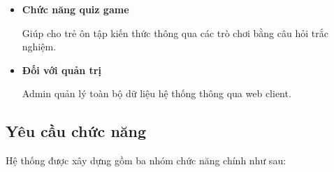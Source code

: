 \begin{itemize}[label=$\diamond$,leftmargin=1.2cm,itemsep=0.35cm]
	Người dùng chụp ảnh chứa nội dung là tiếng Anh, hệ thống sẽ dịch nghĩa sang tiếng Việt tự động cho người dùng.
	
	\begin{itemize}[label=\textbullet,leftmargin=1.2cm,itemsep=0.15cm]
		\item Nhận diện văn bản bằng OCR
		\item Dịch sang tiếng Việt bằng AI
		\item Hiển thị kết quả trực tiếp cho người dùng
	\end{itemize}
	
	\item \textbf{Chức năng quiz game}
	
	Giúp cho trẻ ôn tập kiến thức thông qua các trò chơi bằng câu hỏi trắc nghiệm.
	
	\item \textbf{Đối với quản trị}
	
	Admin quản lý toàn bộ dữ liệu hệ thống thông qua web client.
	
\end{itemize}

\subsection{Yêu cầu chức năng}

Hệ thống được xây dựng gồm ba nhóm chức năng chính như sau:

